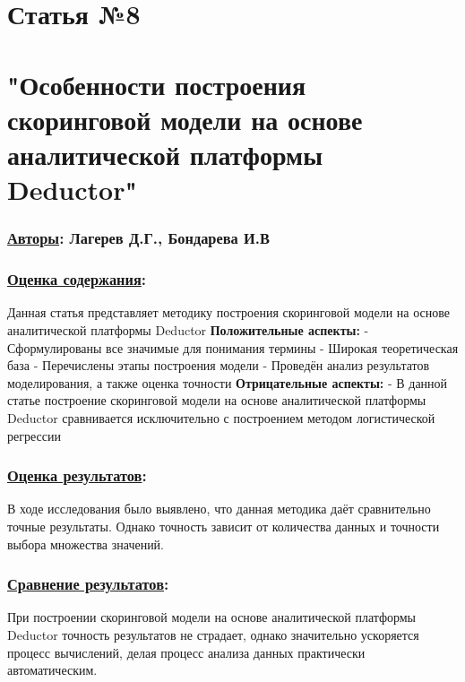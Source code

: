 \documentclass[a4paper,14pt]{article}
\begin{document}
\newpage


\section*{Статья №8}
\section*{"Особенности построения скоринговой модели на основе аналитической платформы Deductor"}
\subsubsection*{\underline{Авторы}: Лагерев Д.Г., Бондарева И.В}

\subsubsection*{\underline{Оценка содержания}:}
Данная статья представляет методику построения скоринговой модели на основе аналитической платформы Deductor \newline
\textbf{Положительные аспекты:} \newline
- Сформулированы все значимые для понимания термины \newline
- Широкая теоретическая база \newline
- Перечислены этапы построения модели \newline
- Проведён анализ результатов моделирования, а также оценка точности \vspace{10pt} \newline
\textbf{Отрицательные аспекты:} \newline
- В данной статье построение скоринговой модели на основе аналитической платформы Deductor сравнивается исключительно с построением методом логистической регрессии
\subsubsection*{\underline{Оценка результатов}:}
В ходе исследования было выявлено, что данная методика даёт сравнительно точные результаты. Однако точность зависит от количества данных и точности выбора множества значений.
\subsubsection*{\underline{Сравнение результатов}:}
При построении скоринговой модели на основе аналитической платформы Deductor точность результатов не страдает, однако значительно ускоряется процесс вычислений, делая процесс анализа данных практически автоматическим.
\end{document}
